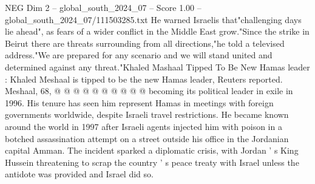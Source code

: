\begin{textsample}{NEG Dim 2 – global\_south\_2024\_07 – Score 1.00 – global\_south\_2024\_07/111503285.txt}
He warned Israelis that"challenging days lie ahead", as fears of a wider conflict in the Middle East grow."Since the strike in Beirut there are threats surrounding from all directions,"he told a televised address."We are prepared for any scenario and we will stand united and determined against any threat."Khaled Mashaal Tipped To Be New Hamas leader : Khaled Meshaal is tipped to be the new Hamas leader, Reuters reported.
Meshaal, 68, @ @ @ @ @ @ @ @ @ @ becoming its political leader in exile in 1996.
His tenure has seen him represent Hamas in meetings with foreign governments worldwide, despite Israeli travel restrictions.
He became known around the world in 1997 after Israeli agents injected him with poison in a botched assassination attempt on a street outside his office in the Jordanian capital Amman.
The incident sparked a diplomatic crisis, with Jordan ' s King Hussein threatening to scrap the country ' s peace treaty with Israel unless the antidote was provided and Israel did so.

\end{textsample}
